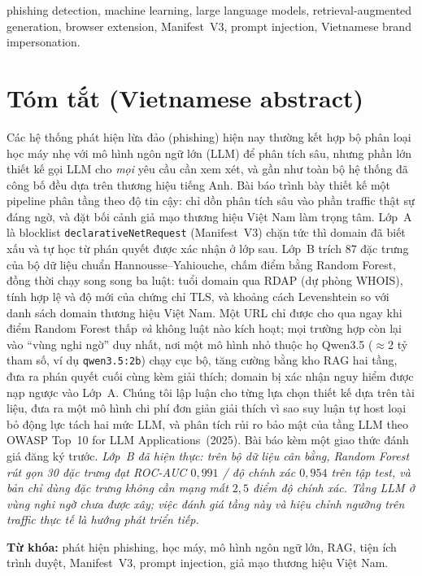 \documentclass[conference]{IEEEtran}
\begin{document}
\begin{IEEEkeywords}
phishing detection, machine learning, large language models, retrieval-augmented
generation, browser extension, Manifest~V3, prompt injection, Vietnamese brand
impersonation.
\end{IEEEkeywords}

\section*{Tóm tắt (Vietnamese abstract)}
Các hệ thống phát hiện lừa đảo (phishing) hiện nay thường kết hợp bộ phân loại
học máy nhẹ với mô hình ngôn ngữ lớn (LLM) để phân tích sâu, nhưng phần lớn thiết
kế gọi LLM cho \emph{mọi} yêu cầu cần xem xét, và gần như toàn bộ hệ thống đã công
bố đều dựa trên thương hiệu tiếng Anh. Bài báo trình bày thiết kế một pipeline
phân tầng theo độ tin cậy: chỉ dồn phân tích sâu vào phần traffic thật sự đáng
ngờ, và đặt bối cảnh giả mạo thương hiệu Việt Nam làm trọng tâm. Lớp~A là
blocklist \texttt{declarativeNetRequest} (Manifest~V3) chặn tức thì domain đã
biết xấu và tự học từ phán quyết được xác nhận ở lớp sau. Lớp~B trích 87 đặc
trưng của bộ dữ liệu chuẩn Hannousse--Yahiouche, chấm điểm bằng Random Forest,
đồng thời chạy song song ba luật: tuổi domain qua RDAP (dự phòng WHOIS), tính hợp
lệ và độ mới của chứng chỉ TLS, và khoảng cách Levenshtein so với danh sách domain
thương hiệu Việt Nam. Một URL chỉ được cho qua ngay khi điểm Random Forest thấp
\emph{và} không luật nào kích hoạt; mọi trường hợp còn lại vào ``vùng nghi ngờ''
duy nhất, nơi một mô hình nhỏ thuộc họ Qwen3.5 ($\approx$2 tỷ tham số, ví dụ
\texttt{qwen3.5:2b}) chạy cục bộ, tăng cường bằng kho RAG hai tầng, đưa ra phán
quyết cuối cùng kèm giải thích; domain bị xác nhận nguy hiểm được nạp ngược vào Lớp~A. Chúng tôi lập
luận cho từng lựa chọn thiết kế dựa trên tài liệu, đưa ra một mô hình chi phí đơn
giản giải thích vì sao suy luận tự host loại bỏ động lực tách hai mức LLM, và phân
tích rủi ro bảo mật của tầng LLM theo OWASP Top~10 for LLM Applications~(2025).
Bài báo kèm một giao thức đánh giá đăng ký trước. \emph{Lớp~B đã hiện thực: trên
bộ dữ liệu cân bằng, Random Forest rút gọn 30 đặc trưng đạt ROC-AUC $0{,}991$ /
độ chính xác $0{,}954$ trên tập test, và bản chỉ dùng đặc trưng không cần mạng
mất $2{,}5$ điểm độ chính xác. Tầng LLM ở vùng nghi ngờ chưa được xây; việc đánh
giá tầng này và hiệu chỉnh ngưỡng trên traffic thực tế là hướng phát triển tiếp.}

\medskip
\noindent\textbf{Từ khóa:} phát hiện phishing, học máy, mô hình ngôn ngữ lớn, RAG,
tiện ích trình duyệt, Manifest~V3, prompt injection, giả mạo thương hiệu Việt Nam.
\end{document}
